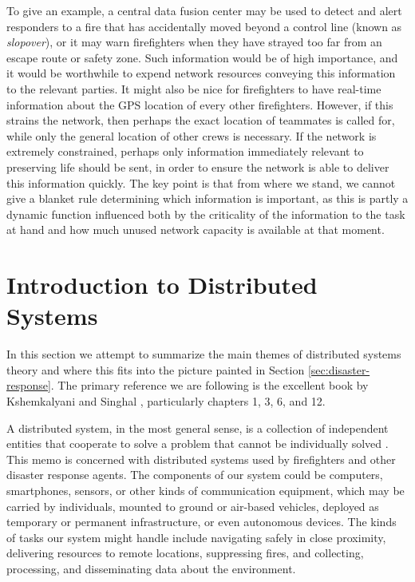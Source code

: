 \documentclass[]             %
{NASA}                       %
\theoremstyle{definition}
\begin{document}
To give an example, a central data fusion center may be used to detect
and alert responders to a fire that has accidentally moved beyond a
control line (known as \emph{slopover}), or it may warn firefighters
when they have strayed too far from an escape route or safety
zone. Such information would be of high importance, and it would be
worthwhile to expend network resources conveying this information to
the relevant parties. It might also be nice for firefighters to have
real-time information about the GPS location of every other
firefighters. However, if this strains the network, then perhaps the
exact location of teammates is called for, while only the general
location of other crews is necessary. If the network is extremely
constrained, perhaps only information immediately relevant to
preserving life should be sent, in order to ensure the network is able
to deliver this information quickly. The key point is that from where
we stand, we cannot give a blanket rule determining which information
is important, as this is partly a dynamic function influenced both by
the criticality of the information to the task at hand and how much
unused network capacity is available at that moment.


\section{Introduction to Distributed Systems}
\label{sec:background}
In this section we attempt to summarize the main themes of distributed
systems theory and where this fits into the picture painted in Section
\ref{sec:disaster-response}. The primary reference we are following is
the excellent book by Kshemkalyani and Singhal
\cite{kshemkalyani_singhal_2008}, particularly chapters 1, 3, 6, and
12.

A distributed system, in the most general sense, is a collection of
independent entities that cooperate to solve a problem that cannot be
individually solved \cite{kshemkalyani_singhal_2008}. This memo is
concerned with distributed systems used by firefighters and other
disaster response agents. The components of our system could be
computers, smartphones, sensors, or other kinds of communication
equipment, which may be carried by individuals, mounted to ground or
air-based vehicles, deployed as temporary or permanent infrastructure,
or even autonomous devices. The kinds of tasks our system might handle
include navigating safely in close proximity, delivering resources to
remote locations, suppressing fires, and collecting, processing, and
disseminating data about the environment.
\end{document}
